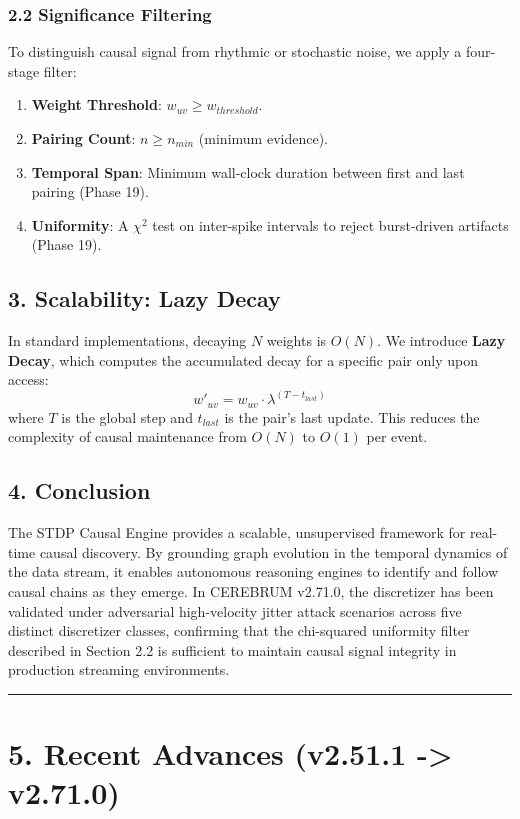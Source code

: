\subsubsection*{2.2 Significance Filtering}
To distinguish causal signal from rhythmic or stochastic noise, we apply a four-stage filter:
\begin{enumerate}
  \item  \textbf{Weight Threshold}: $w_{uv} \geq w_{threshold}$.
  \item  \textbf{Pairing Count}: $n \geq n_{min}$ (minimum evidence).
  \item  \textbf{Temporal Span}: Minimum wall-clock duration between first and last pairing (Phase 19).
  \item  \textbf{Uniformity}: A $\chi^2$ test on inter-spike intervals to reject burst-driven artifacts (Phase 19).
\end{enumerate}


\subsection*{3. Scalability: Lazy Decay}
In standard implementations, decaying $N$ weights is $O(N)$. We introduce \textbf{Lazy Decay}, which computes the accumulated decay for a specific pair only upon access:
$$w'_{uv} = w_{uv} \cdot \lambda^{(T - t_{last})}$$
where $T$ is the global step and $t_{last}$ is the pair's last update. This reduces the complexity of causal maintenance from $O(N)$ to $O(1)$ per event.

\subsection*{4. Conclusion}
The STDP Causal Engine provides a scalable, unsupervised framework for real-time causal discovery. By grounding graph evolution in the temporal dynamics of the data stream, it enables autonomous reasoning engines to identify and follow causal chains as they emerge. In CEREBRUM v2.71.0, the discretizer has been validated under adversarial high-velocity jitter attack scenarios across five distinct discretizer classes, confirming that the chi-squared uniformity filter described in Section 2.2 is sufficient to maintain causal signal integrity in production streaming environments.

\medskip\noindent\rule{\linewidth}{0.4pt}\medskip

\section*{5. Recent Advances (v2.51.1 -> v2.71.0)}


